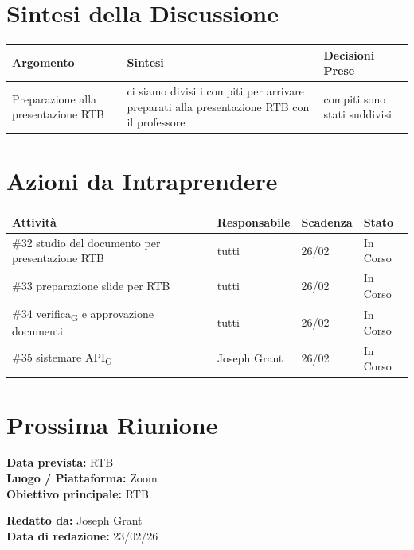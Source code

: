 \documentclass[a4paper,12pt]{article}
\newcommand{\gls}[1]{#1\textsubscript{G}}
\begin{document}
\section*{ Sintesi della Discussione}

\begin{longtable}{|p{}|p{}|p{}|}
\hline
\textbf{Argomento} & \textbf{Sintesi} & \textbf{Decisioni Prese} \\ \hline
Preparazione alla presentazione RTB & ci siamo divisi i compiti per arrivare preparati alla presentazione RTB con il professore & compiti sono stati suddivisi \\ \hline
\end{longtable}

\section*{ Azioni da Intraprendere}

\begin{longtable}{|p{}|p{}|p{}|p{}|}
\hline
\textbf{Attività} & \textbf{Responsabile} & \textbf{Scadenza} & \textbf{Stato} \\ \hline
\#32 studio del documento per presentazione RTB & tutti  & 26/02  &In Corso  \\ \hline
\#33 preparazione slide per RTB & tutti  & 26/02  &In Corso  \\ \hline
\#34 \gls{verifica} e approvazione documenti & tutti  & 26/02  &In Corso  \\ \hline
\#35 sistemare \gls{API} & Joseph Grant  & 26/02  &In Corso  \\ \hline


\end{longtable}


\section*{ Prossima Riunione}
\textbf{Data prevista:} RTB \\
\textbf{Luogo / Piattaforma:} Zoom \\
\textbf{Obiettivo principale:} RTB

\textbf{Redatto da:} Joseph Grant \\
\textbf{Data di redazione:} 23/02/26
\end{document}
